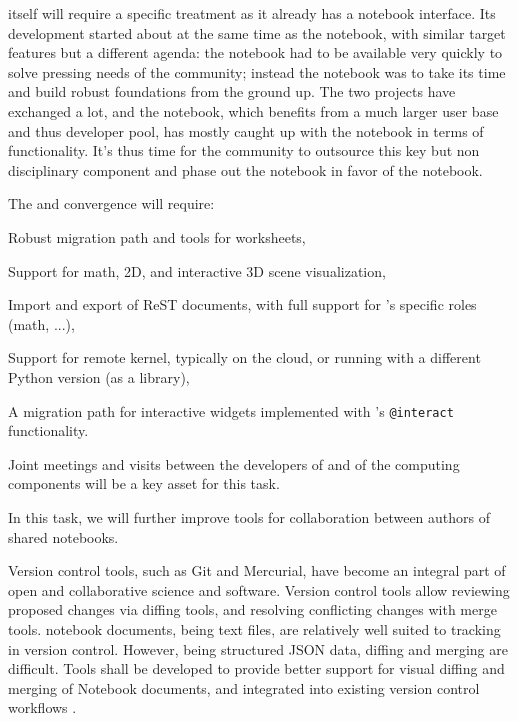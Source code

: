\begin{workpackage}
\begin{tasklist}
\begin{task}[title=Uniform notebook interface for all interactive components,id=ipython-kernels]
  \Sage itself will require a specific treatment as it already has a
  notebook interface. Its development started about at the same time
  as the \Jupyter notebook, with similar target features but a
  different agenda: the \Sage notebook had to be available very quickly
  to solve pressing needs of the \Sage community; instead the \Jupyter
  notebook was to take its time and build robust foundations from the
  ground up. The two projects have exchanged a lot, and the \Jupyter
  notebook, which benefits from a much larger user base and thus
  developer pool, has mostly caught up with the \Sage notebook in terms
  of functionality. It's thus time for the \Sage community to outsource
  this key but non disciplinary component and phase out the \Sage
  notebook in favor of the \Jupyter notebook.

  The \Sage and \Jupyter convergence  will
  require:
  \begin{compactitem}
  \item Robust migration path and tools for \Sage worksheets,
  \item Support for math, 2D, and interactive 3D scene visualization,
  \item Import and export of ReST documents, with full support for
    \Sage's specific roles (math, ...),
  \item Support for remote \Sage kernel, typically on the cloud, or
    running with a different Python version (\Sage as a library),
  \item A migration path for interactive widgets implemented with
    \Sage's \texttt{@interact} functionality.
  \end{compactitem}

  Joint meetings and visits between the developers of \Jupyter and of
  the computing components will be a key asset for this task.

\end{task}

\begin{task}[id=notebook-collab,title=Notebook improvements for collaboration,lead=SR]
  In this task, we will further improve tools for collaboration between
  authors of shared \Jupyter notebooks.

  Version control tools, such as Git and Mercurial, have become an integral part of open and
  collaborative science and software. Version control tools allow reviewing proposed changes via
  diffing tools, and resolving conflicting changes with merge tools. \Jupyter notebook documents,
  being text files, are relatively well suited to tracking in version control. However, being
  structured JSON data, diffing and merging are difficult. Tools shall be developed to provide
  better support for visual diffing and merging of Notebook documents, and integrated into existing
  version control workflows .


\end{task}
\end{tasklist}
\end{workpackage}
